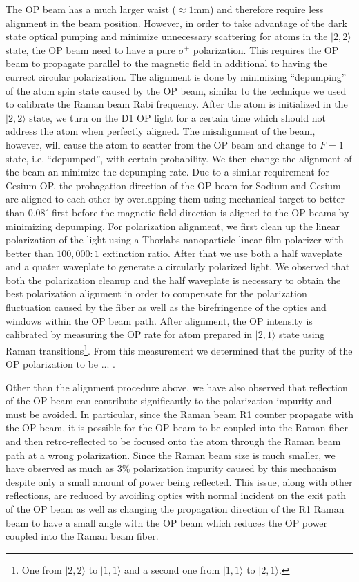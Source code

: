 The OP beam has a much larger waist ($\approx1\mathrm{mm}$)
and therefore require less alignment in the beam position.
However, in order to take advantage of the dark state optical pumping and
minimize unnecessary scattering for atoms in the $|2,2\rangle$ state,
the OP beam need to have a pure $\sigma^+$ polarization.
This requires the OP beam to propagate parallel to the magnetic field
in additional to having the currect circular polarization.
The alignment is done by minimizing ``depumping'' of the atom spin state caused by the OP beam,
similar to the technique we used to calibrate the Raman beam Rabi frequency.
After the atom is initialized in the $|2,2\rangle$ state, we turn on the D1 OP light
for a certain time which should not address the atom when perfectly aligned.
The misalignment of the beam, however, will cause the atom to scatter from the OP beam
and change to $F=1$ state, i.e. ``depumped'', with certain probability.
We then change the alignment of the beam an minimize the depumping rate.
Due to a similar requirement for Cesium OP, the probagation direction of
the OP beam for Sodium and Cesium are aligned to each other by overlapping them
using mechanical target to better than $0.08^\circ$ first
before the magnetic field direction is aligned to the OP beams by minimizing depumping.
For polarization alignment, we first clean up the linear polarization of the light
using a Thorlabs nanoparticle linear film polarizer with better than $100,000:1$
extinction ratio. After that we use both a half waveplate and a quater waveplate
to generate a circularly polarized light.
We observed that both the polarization cleanup and the half waveplate is necessary
to obtain the best polarization alignment in order to compensate for the polarization
fluctuation caused by the fiber as well as the birefringence of the optics and windows
within the OP beam path. After alignment, the OP intensity is calibrated
by measuring the OP rate for atom prepared in $|2,1\rangle$ state
using Raman transitions\footnote{One from $|2,2\rangle$ to $|1,1\rangle$
  and a second one from $|1,1\rangle$ to $|2,1\rangle$.}.
From this measurement we determined that the purity of the OP polarization
to be ... .

Other than the alignment procedure above, we have also observed that reflection
of the OP beam can contribute significantly to the polarization impurity and
must be avoided. In particular, since the Raman beam R1 counter propagate with the OP beam,
it is possible for the OP beam to be coupled into the Raman fiber and then retro-reflected
to be focused onto the atom through the Raman beam path at a wrong polarization.
Since the Raman beam size is much smaller, we have observed as much as $3\%$
polarization impurity caused by this mechanism despite only a small amount of
power being reflected. This issue, along with other reflections,
are reduced by avoiding optics with normal incident on the exit path of the OP beam
as well as changing the propagation direction of the R1 Raman beam
to have a small angle with the OP beam which reduces the OP power coupled into
the Raman beam fiber.

